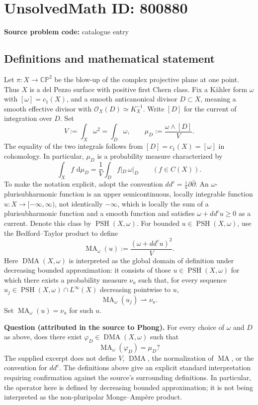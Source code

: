 \documentclass[11pt]{article}
\newcommand{\dd}{\,\mathrm{d}}
\begin{document}
\section*{UnsolvedMath ID: 800880}
\textbf{Source problem code:} catalogue entry
\subsection{Definitions and mathematical statement}
Let \(\pi\colon X\to\mathbb{CP}^{2}\) be the blow-up of the complex projective plane at one point. Thus \(X\) is a del Pezzo surface with positive first Chern class. Fix a K\"ahler form \(\omega\) with \([\omega]=c_1(X)\), and a smooth anticanonical divisor \(D\subset X\), meaning a smooth effective divisor with \(\mathcal O_X(D)\simeq K_X^{-1}\). Write \([D]\) for the current of integration over \(D\). Set
\[
V:=\int_X\omega^2=\int_D\omega,
\qquad
\mu_D:=\frac{\omega\wedge[D]}{V}.
\]
The equality of the two integrals follows from \([D]=c_1(X)=[\omega]\) in cohomology. In particular, \(\mu_D\) is a probability measure characterized by
\[
\int_X f\,\dd\mu_D=\frac1V\int_D f|_D\,\omega|_D
\qquad(f\in C(X)).
\]
To make the notation explicit, adopt the convention \(dd^c=\frac{i}{\pi}\partial\bar\partial\). An \(\omega\)-plurisubharmonic function is an upper semicontinuous, locally integrable function \(u\colon X\to[-\infty,\infty)\), not identically \(-\infty\), which is locally the sum of a plurisubharmonic function and a smooth function and satisfies \(\omega+dd^c u\geq0\) as a current. Denote this class by \(\operatorname{PSH}(X,\omega)\). For bounded \(u\in\operatorname{PSH}(X,\omega)\), use the Bedford--Taylor product to define
\[
\operatorname{MA}_{\omega}(u):=\frac{(\omega+dd^c u)^2}{V}.
\]
Here \(\operatorname{DMA}(X,\omega)\) is interpreted as the global domain of definition under decreasing bounded approximation: it consists of those \(u\in\operatorname{PSH}(X,\omega)\) for which there exists a probability measure \(\nu_u\) such that, for every sequence \(u_j\in\operatorname{PSH}(X,\omega)\cap L^\infty(X)\) decreasing pointwise to \(u\),
\[
\operatorname{MA}_{\omega}(u_j)\rightharpoonup\nu_u.
\]
Set \(\operatorname{MA}_{\omega}(u)=\nu_u\) for such \(u\).

\textbf{Question (attributed in the source to Phong).} For every choice of \(\omega\) and \(D\) as above, does there exist \(\varphi_D\in\operatorname{DMA}(X,\omega)\) such that
\[
\operatorname{MA}_{\omega}(\varphi_D)=\mu_D?
\]
The supplied excerpt does not define \(V\), \(\operatorname{DMA}\), the normalization of \(\operatorname{MA}\), or the convention for \(dd^c\). The definitions above give an explicit standard interpretation requiring confirmation against the source's surrounding definitions. In particular, the operator here is defined by decreasing bounded approximation; it is not being interpreted as the non-pluripolar Monge--Amp\`ere product.
\end{document}
